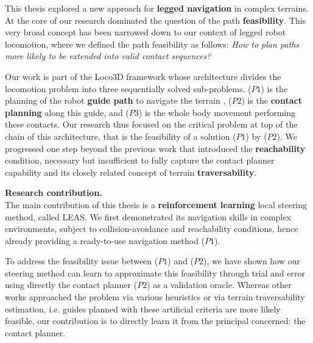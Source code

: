 

This thesis explored a new approach for \textbf{legged navigation} in complex terrains. At the core of our research dominated the question of the path \textbf{feasibility}.
This very broad concept has been narrowed down to our context of legged robot locomotion, where we defined the path feasibility as follows:
\textit{How to plan paths more likely to be extended into valid contact sequences?}

Our work is part of the Loco3D framework whose architecture divides the locomotion problem into three sequentially solved sub-problems. ($P1$) is the planning of the robot \textbf{guide path} to navigate the terrain , ($P2$) is the \textbf{contact planning} along this guide, and ($P3$) is the whole body movement performing these contacts.
Our research thus focused on the critical problem at top of the chain of this architecture, that is the feasibility of a solution ($P1$) by ($P2$).
We progressed one step beyond the previous work \cite{RB-PRM} that introduced the \textbf{reachability} condition, necessary but insufficient to fully capture the contact planner capability and its closely related concept of terrain \textbf{traversability}.

\hfill \break

\noindent\textbf{Research contribution.}\\

The main contribution of this thesis is a \textbf{reinforcement learning} local steering method, called LEAS. We first demonstrated its navigation skills in complex environments, subject to collision-avoidance and reachability conditions, hence already providing a ready-to-use navigation method ($P1$).

To address the feasibility issue between ($P1$) and ($P2$), we have shown how our steering method can learn to approximate this feasibility through trial and error using directly the contact planner ($P2$) as a validation oracle.
Whereas other works approached the problem via various heuristics or via terrain traversability estimation, i.e. guides planned with these artificial criteria are more likely feasible, our contribution is to directly learn it from the principal concerned: the contact planner.



